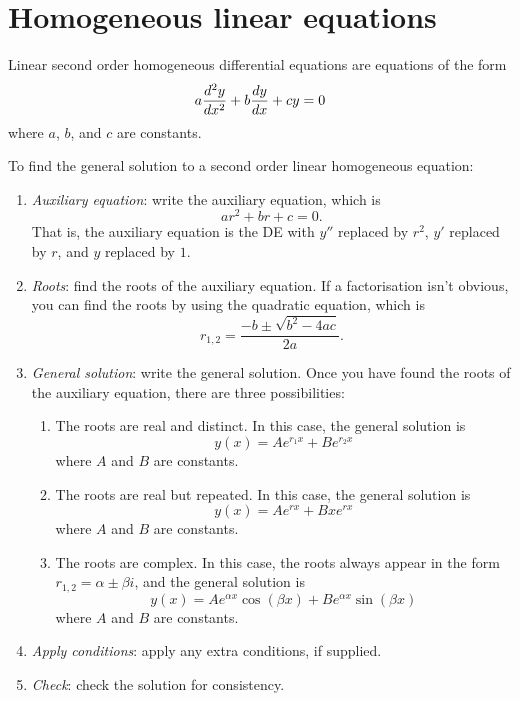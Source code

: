 \documentclass{book}
\begin{document}

\newpage
\section{Homogeneous linear equations}

Linear second order homogeneous differential equations are equations
of the form
\begin{dmath}
  \label{eq:second_order_linear_homogeneous}
  a \ddtwo{y}{x} + b \dd{y}{x} + c y = 0
\end{dmath}
where $a$, $b$, and $c$ are constants.

To find the general solution to a second order linear homogeneous equation:
\begin{enumerate}
\item \emph{Auxiliary equation}: write the auxiliary equation, which
  is
  \begin{equation*}
    a r^2 + b r + c = 0.
  \end{equation*}
  That is, the auxiliary equation is the DE with $y''$ replaced by
  $r^2$, $y'$ replaced by $r$, and $y$ replaced by $1$.
\item \emph{Roots}: find the roots of the auxiliary equation.  If a
  factorisation isn't obvious, you can find the roots by using the
  quadratic equation, which is
  \begin{equation*}
    r_{1,2} = \frac{-b \pm \sqrt{b^2 - 4ac}}{2a}.
  \end{equation*}
\item \emph{General solution}: write the general solution.  Once you
  have found the roots of the auxiliary equation, there are three
  possibilities:
  \begin{enumerate}
  \item The roots are real and distinct.  In this case, the general
    solution is
    \begin{equation*}
      y(x) = A e^{r_1 x} + B e^{r_2 x}
    \end{equation*}
    where $A$ and $B$ are constants.
  \item The roots are real but repeated.  In this case, the general
    solution is
    \begin{equation*}
      y(x) = A e^{r x} + B x e^{r x}
    \end{equation*}
    where $A$ and $B$ are constants.
  \item The roots are complex.  In this case, the roots always appear
    in the form $r_{1,2} = \alpha \pm \beta i$, and the general
    solution is
    \begin{equation*}
      y(x) = A e^{\alpha x} \cos(\beta x) + B e^{\alpha x} \sin(\beta x)
    \end{equation*}
    where $A$ and $B$ are constants.
  \end{enumerate}
\item \emph{Apply conditions}: apply any extra conditions, if
  supplied.
\item \emph{Check}: check the solution for consistency.
\end{enumerate}
\end{document}
